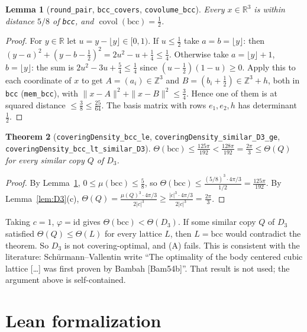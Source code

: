 \documentclass[11pt]{article}
\newtheorem{theorem}{Theorem}
\newtheorem{lemma}[theorem]{Lemma}
\theoremstyle{definition}
\theoremstyle{remark}
\newcommand{\R}{\mathbb{R}}
\newcommand{\Z}{\mathbb{Z}}
\newcommand{\covol}{\operatorname{covol}}
\newcommand{\bcc}{\mathrm{bcc}}
\begin{document}
\begin{lemma}[\texttt{round\_pair}, \texttt{bcc\_covers}, \texttt{covolume\_bcc}]\label{lem:bcc}
Every $x\in\R^3$ is within distance $5/8$ of \texttt{bcc}, and $\covol(\bcc)=\tfrac12$.
\end{lemma}
\begin{proof}
For $y\in\R$ let $u=y-\lfloor y\rfloor\in[0,1)$. If $u\le\frac12$ take $a=b=\lfloor y\rfloor$: then
$(y-a)^2+(y-b-\frac12)^2=2u^2-u+\frac14\le\frac14$. Otherwise take $a=\lfloor y\rfloor+1$,
$b=\lfloor y\rfloor$: the sum is $2u^2-3u+\frac54\le\frac14$ since $(u-\frac12)(1-u)\ge0$. Apply this to
each coordinate of $x$ to get $A=(a_i)\in\Z^3$ and $B=(b_i+\frac12)\in\Z^3+h$, both in \texttt{bcc}
(\texttt{mem\_bcc}), with $\|x-A\|^2+\|x-B\|^2\le\frac34$. Hence one of them is at squared distance
$\le\frac38\le\frac{25}{64}$. The basis matrix with rows $e_1,e_2,h$ has determinant $\frac12$.
\end{proof}

\begin{theorem}[\texttt{coveringDensity\_bcc\_le}, \texttt{coveringDensity\_similar\_D3\_ge},
\texttt{coveringDensity\_bcc\_lt\_similar\_D3}]
$\Theta(\bcc)\le\frac{125\pi}{192}<\frac{128\pi}{192}=\frac{2\pi}{3}\le\Theta(Q)$ for every similar
copy $Q$ of $D_3$.
\end{theorem}
\begin{proof}
By Lemma~\ref{lem:bcc}, $0\le\mu(\bcc)\le\frac58$, so $\Theta(\bcc)\le\frac{(5/8)^3\cdot 4\pi/3}{1/2}=\frac{125\pi}{192}$.
By Lemma~\ref{lem:D3}(c), $\Theta(Q)=\frac{\mu(Q)^3\cdot 4\pi/3}{2|c|^3}\ge\frac{|c|^3\cdot4\pi/3}{2|c|^3}=\frac{2\pi}{3}$.
\end{proof}

Taking $c=1$, $\varphi=\mathrm{id}$ gives $\Theta(\bcc)<\Theta(D_3)$. If some similar copy $Q$ of
$D_3$ satisfied $\Theta(Q)\le\Theta(L)$ for every lattice $L$, then $L=\bcc$ would contradict the
theorem. So $D_3$ is not covering-optimal, and (A) fails. This is consistent with the literature:
Sch\"urmann--Vallentin write ``The optimality of the body centered cubic lattice [\dots] was first
proven by Bambah [Bam54b]''. That result is not used; the argument above is self-contained.

\section{Lean formalization}
\end{document}
